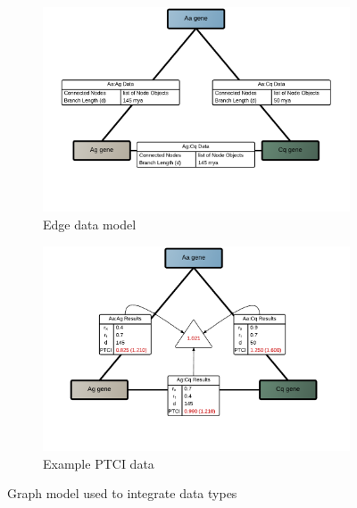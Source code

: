 \begin{figure}[hp]
\begin{subfigure}[t]{.5\linewidth}
    \includegraphics[width=\linewidth]{figures/figs/gfunc_graph_figs/ortho-graph-edge-data.pdf}
    \caption{Edge data model}\label{fig:nway-ortholog-graph-edge-data}
    \end{subfigure}%
% 
% 
%     
    \begin{subfigure}[t]{.5\linewidth}
    \centering
    \includegraphics[width=\linewidth]{figures/figs/gfunc_graph_figs/ortho-graph-ptci.pdf}
    \caption{Example PTCI data}\label{fig:nway-ortholog-graph-ptci}
    \end{subfigure}
% 
% 
% 
\caption{Graph model used to integrate data types}\label{fig:nway-ortholog-graph}
\end{figure}